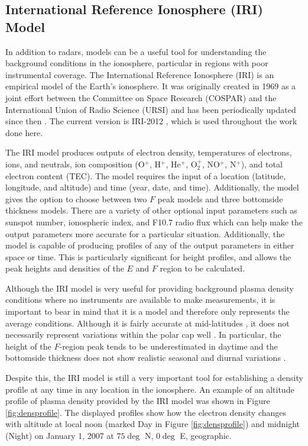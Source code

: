 \subsection{International Reference Ionosphere (IRI) Model}
\label{sec:iri}
In addition to radars, models can be a useful tool for understanding the background conditions in the ionosphere, particular in regions with poor instrumental coverage.  The International Reference Ionosphere (IRI) is an empirical model of the Earth's ionosphere.  It was originally created in 1969 as a joint effort between the Committee on Space Research (COSPAR) and the International Union of Radio Science (URSI) and has been periodically updated since then \citep{Rawer1975,Rawer1978,Rawer1981,Bilitza1985,Bilitza1986,Bilitza1990,Bilitza1997,Bilitza2001,Bilitza2008}.  The current version is IRI-2012 \citep{Bilitza2014}, which is used throughout the work done here.

The IRI model produces outputs of electron density, temperatures of electrons, ions, and neutrals, ion composition (O\(^+\), H\(^+\), He\(^+\), O\(_2^+\), NO\(^+\), N\(^+\)), and total electron content (TEC).  The model requires the input of a location (latitude, longitude, and altitude) and time (year, date, and time).  Additionally, the model gives the option to choose between two \(F\) peak models and three bottomside thickness models.  There are a variety of other optional input parameters such as sunspot number, ionospheric index, and F10.7 radio flux which can help make the output parameters more accurate for a particular situation.  Additionally, the model is capable of producing profiles of any of the output parameters in either space or time.  This is particularly significant for height profiles, and allows the peak heights and densities of the \(E\) and \(F\) region to be calculated.

Although the IRI model is very useful for providing background plasma density conditions where no instruments are available to make measurements, it is important to bear in mind that it is a model and therefore only represents the average conditions.  Although it is fairly accurate at mid-latitudes \citep{Coisson2006,Bilitza2012}, it does not necessarily represent variations within the polar cap well \citep{Themens2014,Makarevich2015b}.  In particular, the height of the \(F\)-region peak tends to be underestimated in daytime and the bottomside thickness does not show realistic seasonal and diurnal variations \citep{Themens2014}.  

Despite this, the IRI model is still a very important tool for establishing a density profile at any time in any location in the ionosphere.  An example of an altitude profile of plasma density provided by the IRI model was shown in Figure \ref{fig:densprofile}.  The displayed profiles show how the electron density changes with altitude at local noon (marked Day in Figure \ref{fig:densprofile}) and midnight (Night) on January 1, 2007 at \(75\deg\) N, \(0\deg\) E, geographic.

